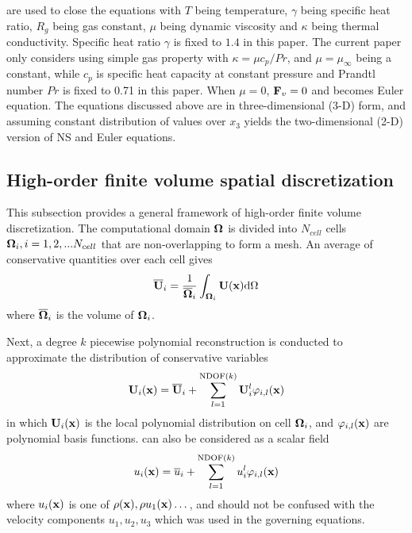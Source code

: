 are used to close the equations
with $T$ being temperature, $\gamma$ being specific heat ratio,
$R_g$ being  gas constant, $\mu$ being dynamic viscosity and
$\kappa$ being thermal conductivity.
Specific heat ratio $\gamma$ is fixed to $1.4$ in this paper.
The current paper only
considers using simple gas property
with $\kappa = \mu c_p / Pr$,
and $\mu=\mu_{\infty}$ being a constant,
while $c_p$ is specific heat capacity
at constant pressure and
Prandtl number $Pr$ is fixed to 0.71 in this paper.
When $\mu=0$,
$\mathbf{F}_v=0$ and
 becomes Euler equation.
The equations discussed above are in three-dimensional (3-D) form, and
assuming constant distribution of values over $x_3$
yields the two-dimensional (2-D) version of NS and Euler equations.

\subsection{High-order finite volume spatial discretization}
\label{ssec:FV}




This subsection provides a general framework of
high-order
finite volume discretization.
The computational domain $\mathbf{\Omega}$ is divided
into $N_{cell}$ cells $\mathbf{\Omega}_i, i=1,2,...N_{cell}$ that
are non-overlapping to form a mesh.
An average of conservative quantities
over each cell gives
\begin{equation}
    \label{eq:FVMean}
    \overline{\mathbf{U}}_i = \frac{1}{\overline{\mathbf{\Omega}}_i}\int_{\mathbf{\Omega}_i}\mathbf{U}(\mathbf{x})\dd \Omega
\end{equation}
where $\overline{\mathbf{\Omega}}_i$ is the volume of $\mathbf{\Omega}_i$.

Next, a degree $k$ piecewise polynomial reconstruction is
conducted to approximate the distribution of
conservative variables
\begin{equation}
    \label{eq:FVRec}
    \mathbf{U}_i(\mathbf{x}) = \overline{\mathbf{U}}_i + \sum_{l=1}^{\mathrm{NDOF}(k)}{\mathbf{U}_i^l\varphi_{i,l}(\mathbf{x}) }
\end{equation}
in which 
$\mathbf{U}_i(\mathbf{x})$ 
is the local polynomial distribution on cell $\mathbf{\Omega}_{i}$,
and
$\varphi_{i,l}(\mathbf{x})$ are
polynomial basis functions.
 can also be considered as a scalar field
\begin{equation}
    \label{eq:FVRecScalar}
    u_i(\mathbf{x}) = \overline{u}_i + \sum_{l=1}^{\mathrm{NDOF}(k)}{u_i^l\varphi_{i,l}(\mathbf{x}) }
\end{equation}
where $u_i(\mathbf{x})$ is one of $\rho(\mathbf{x}), \rho u_1(\mathbf{x})\dots$, and should not
be confused with the velocity components $u_1, u_2, u_3$
which was used in the governing equations.

